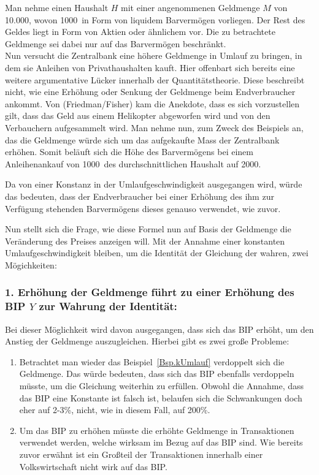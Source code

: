\begin{example}
    Man nehme einen Haushalt $H$ mit einer angenommenen Geldmenge $M$ von 10.000\EUR, wovon 1000\EUR\ in Form von liquidem Barvermögen vorliegen. Der Rest des Geldes liegt in Form von Aktien oder ähnlichem vor. Die zu betrachtete Geldmenge sei dabei nur auf das Barvermögen beschränkt. \\
    Nun versucht die Zentralbank eine höhere Geldmenge in Umlauf zu bringen, in dem sie Anleihen von Privathaushalten kauft. Hier offenbart sich bereits eine weitere argumentative Lücker innerhalb der Quantitätstheorie. Diese beschreibt nicht, wie eine Erhöhung oder Senkung der Geldmenge beim Endverbraucher ankommt. Von (Friedman/Fisher) kam die Anekdote, dass es sich vorzustellen gilt, dass das Geld aus einem Helikopter abgeworfen wird und von den Verbauchern aufgesammelt wird. Man nehme nun, zum Zweck des Beispiels an, das die Geldmenge würde sich um das aufgekaufte Mass der Zentralbank erhöhen. Somit beläuft sich die Höhe des Barvermögens bei einem Anleihenankauf von 1000\EUR\, des durchschnittlichen Haushalt auf 2000\EUR. 

    Da von einer Konstanz in der Umlaufgeschwindigkeit ausgegangen wird, würde das bedeuten, dass der Endverbraucher bei einer Erhöhung des ihm zur Verfügung stehenden Barvermögens dieses genauso verwendet, wie zuvor. 
\end{example}\label{Bsp.kUmlauf}

Nun stellt sich die Frage, wie diese Formel nun auf Basis der Geldmenge die Veränderung des Preises anzeigen will. Mit der Annahme einer konstanten Umlaufgeschwindigkeit bleiben, um die Identität der Gleichung der wahren, zwei Mögichkeiten:

\subsubsection*{1. Erhöhung der Geldmenge führt zu einer Erhöhung des BIP $Y$ zur Wahrung der Identität:}
Bei dieser Möglichkeit wird davon ausgegangen, dass sich das BIP erhöht, um den Anstieg der Geldmenge auszugleichen. Hierbei gibt es zwei große Probleme:

\begin{enumerate}
    \item Betrachtet man wieder das Beispiel\, \vref*{Bsp.kUmlauf} verdoppelt sich die Geldmenge. Das würde bedeuten, dass sich das BIP ebenfalls verdoppeln müsste, um die Gleichung weiterhin zu erfüllen. Obwohl die Annahme, dass das BIP eine Konstante ist falsch ist, belaufen sich die Schwankungen doch eher auf 2-3\%, nicht, wie in diesem Fall, auf 200\%.
    \item Um das BIP zu erhöhen müsste die erhöhte Geldmenge in Transaktionen verwendet werden, welche wirksam im Bezug auf das BIP sind. Wie bereits zuvor erwähnt ist ein Großteil der Transaktionen innerhalb einer Volkswirtschaft nicht wirk auf das BIP.
\end{enumerate}

